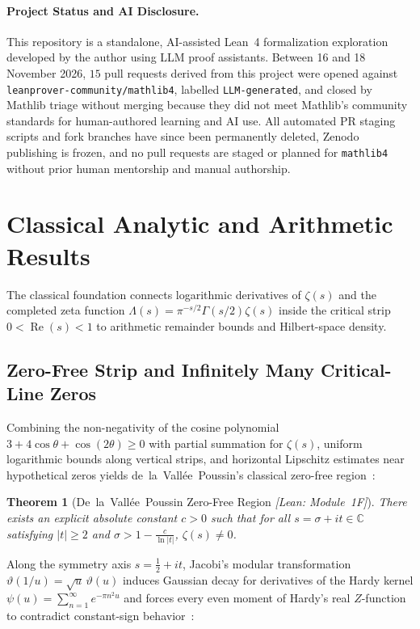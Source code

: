 \documentclass[11pt,a4paper]{article}
\newtheorem{theorem}{Theorem}[section]
\theoremstyle{definition}
\newcommand{\C}{\mathbb{C}}
\begin{document}
\paragraph{Project Status and AI Disclosure.}
This repository is a standalone, AI-assisted Lean~4 formalization exploration developed by the author using LLM proof assistants. Between 16 and 18 November 2026, $15$ pull requests derived from this project were opened against \texttt{leanprover-community/mathlib4}, labelled \texttt{LLM-generated}, and closed by Mathlib triage without merging because they did not meet Mathlib's community standards for human-authored learning and AI use. All automated PR staging scripts and fork branches have since been permanently deleted, Zenodo publishing is frozen, and no pull requests are staged or planned for \texttt{mathlib4} without prior human mentorship and manual authorship.

\section{Classical Analytic and Arithmetic Results}\label{sec:classical}

The classical foundation connects logarithmic derivatives of $\zeta(s)$ and the completed zeta function $\Lambda(s) = \pi^{-s/2}\Gamma(s/2)\zeta(s)$ inside the critical strip $0 < \operatorname{Re}(s) < 1$ to arithmetic remainder bounds and Hilbert-space density.

\subsection{Zero-Free Strip and Infinitely Many Critical-Line Zeros}

Combining the non-negativity of the cosine polynomial $3 + 4\cos\theta + \cos(2\theta) \ge 0$ with partial summation for $\zeta(s)$, uniform logarithmic bounds along vertical strips, and horizontal Lipschitz estimates near hypothetical zeros yields de~la~Vall\'ee~Poussin's classical zero-free region~\cite{deLaValleePoussin1899,Titchmarsh1986}:

\begin{theorem}[De~la~Vall\'ee~Poussin Zero-Free Region \emph{[Lean: Module~1F]}]
There exists an explicit absolute constant $c > 0$ such that for all $s = \sigma + it \in \C$ satisfying $|t| \ge 2$ and $\sigma > 1 - \frac{c}{\ln|t|}$, $\zeta(s) \neq 0$.
\end{theorem}

Along the symmetry axis $s = \tfrac{1}{2} + it$, Jacobi's modular transformation $\vartheta(1/u) = \sqrt{u}\,\vartheta(u)$ induces Gaussian decay for derivatives of the Hardy kernel $\psi(u) = \sum_{n=1}^\infty e^{-\pi n^2 u}$ and forces every even moment of Hardy's real $Z$-function to contradict constant-sign behavior~\cite{Hardy1914}:
\end{document}
